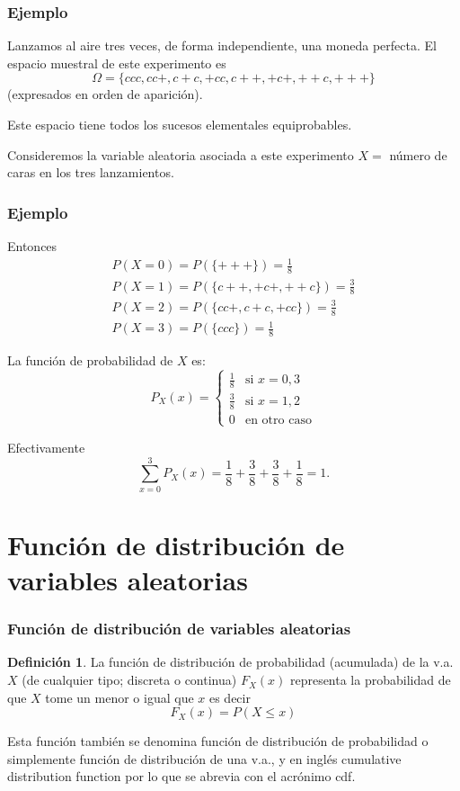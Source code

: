 \documentclass[handout]{beamer}\usepackage[]{graphicx}\usepackage[]{color}
\renewcommand{\emph}[1]{{\color{red}#1}}
\renewcommand{\leq}{\leqslant}
\theoremstyle{plain}
\theoremstyle{definition}
\newtheorem{definicion}{Definición}
\begin{document}
\begin{frame}
\frametitle{Ejemplo}
Lanzamos al aire tres veces, de forma independiente, una
moneda perfecta. El espacio muestral de este experimento es
$$\Omega=\{ccc,cc+,c+c,+cc,c++,+c+,++c,+++\}$$ (expresados en orden
de aparición).

Este espacio tiene todos los sucesos elementales
equiprobables. 


Consideremos la variable aleatoria asociada a este experimento $X=$ número de caras en los tres lanzamientos. 
\end{frame}

\begin{frame}
\frametitle{Ejemplo}
Entonces
    $$\begin{array}{l}
P(X=0)=P(\{+++\})=\frac{1}{8}\\ P(X=1)=P(\{c++,+c+,++c\})=\frac{3}{8}\\
    P(X=2)=P(\{cc+,c+c,+cc\})=\frac{3}{8}\\
    P(X=3)=P(\{ccc\})=\frac{1}{8}
    \end{array}$$

    La función de probabilidad de $X$ es:
    $$P_{X}(x)=\left\{\begin{array}{ll} \frac{1}{8} & \mbox{si } x=0,3\\
\frac{3}{8} & \mbox{si } x=1,2\\ 0 & \mbox{en otro caso}\end{array}\right.$$

Efectivamente  $$\sum_{x=0}^3 P_X(x)= \frac{1}{8}+\frac{3}{8}+\frac{3}{8}+\frac{1}{8}=1.$$


\end{frame}
\section{Función de distribución de variables aleatorias}

\begin{frame}
\frametitle{Función de distribución de variables aleatorias}

\begin{definicion}
La función de \emph{distribución de probabilidad} (acumulada) de la v.a. $X$ (de cualquier tipo;
discreta o continua) $F_{X}(x)$ representa la probabilidad de que $X$  tome un menor o igual que 
 $x$ es decir
$$F_{X}(x)=P(X\leq x)$$
\end{definicion}


Esta función también se denomina función de \emph{distribución de
probabilidad o simplemente función de distribución} de una v.a., y en inglés
\emph{cumulative distribution function} por lo que se abrevia con el acrónimo \emph{cdf}.
\end{frame}
\end{document}
